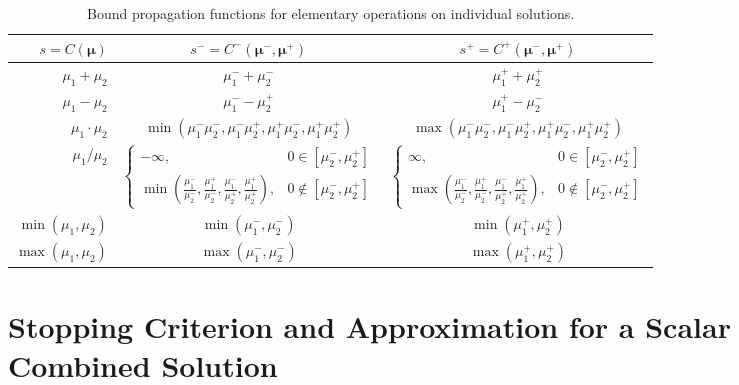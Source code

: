 \documentclass[graybox]{svmult}
\begin{document}
\begin{table}[t]
\begin{tabular}{r  c  c}
    $s=C(\boldsymbol{\mu})$ & $s^- = C^-(\boldsymbol{\mu}^-,\boldsymbol{\mu}^+)$ & $s^+ = C^+(\boldsymbol{\mu}^-,\boldsymbol{\mu}^+)$ \\
    \hline
    $\mu_1+\mu_2$ & $\mu_1^-+\mu_2^-$ & $\mu_1^++\mu_2^+$ \\
    $\mu_1-\mu_2$ & $\mu_1^--\mu_2^+$ & $\mu_1^+-\mu_2^-$ \\
    $\mu_1 \cdot \mu_2$ & $\min(\mu_1^-\mu_2^-,\mu_1^-\mu_2^+,\mu_1^+\mu_2^-,\mu_1^+\mu_2^+)$ & $\max(\mu_1^-\mu_2^-,\mu_1^-\mu_2^+,\mu_1^+\mu_2^-,\mu_1^+\mu_2^+)$ \\
    $\mu_1 / \mu_2$ & $\begin{cases} -\infty, & 0 \in [\mu_2^-,\mu_2^+] \\ \min\left(\frac{\mu_1^-}{\mu_2^-},\frac{\mu_1^+}{\mu_2^-},\frac{\mu_1^-}{\mu_2^+},\frac{\mu_1^+}{\mu_2^+}\right), & 0 \notin [\mu_2^-,\mu_2^+] \end{cases}$ & $\begin{cases} \infty, & 0 \in [\mu_2^-,\mu_2^+] \\ \max\left(\frac{\mu_1^-}{\mu_2^-},\frac{\mu_1^+}{\mu_2^-},\frac{\mu_1^-}{\mu_2^+},\frac{\mu_1^+}{\mu_2^+}\right), & 0 \notin [\mu_2^-,\mu_2^+] \end{cases}$ \\
    $\min(\mu_1,\mu_2)$ & $\min(\mu_1^-,\mu_2^-)$ & $\min(\mu_1^+,\mu_2^+)$ \\
    $\max(\mu_1,\mu_2)$ & $\max(\mu_1^-,\mu_2^-)$ & $\max(\mu_1^+,\mu_2^+)$ \\
    \hline
\end{tabular}
\caption{Bound propagation functions for elementary operations on individual solutions.}
\label{table:elementary_ops_Cpm}
\end{table}

\section{Stopping Criterion and Approximation for a Scalar Combined Solution} \label{sec:opt_comb_sol_sc}
\end{document}
